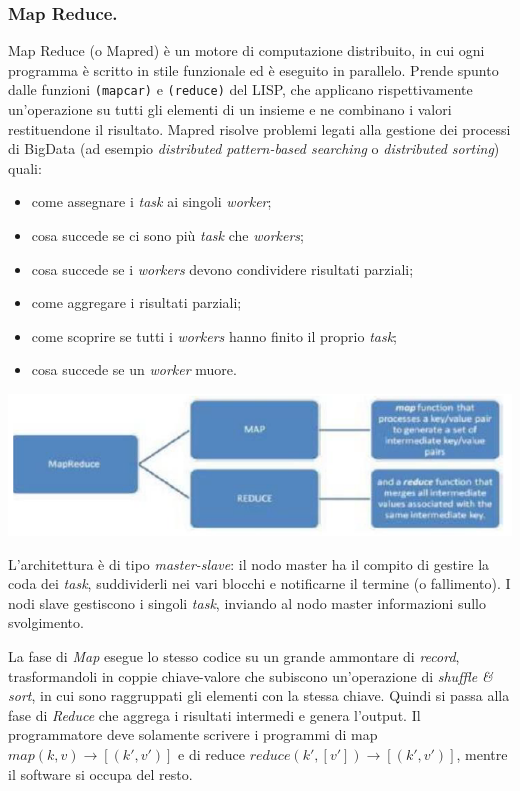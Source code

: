 \documentclass[a4page, 11pt]{article}
\begin{document}
\subsubsection{Map Reduce.}
Map Reduce (o Mapred) è un motore di computazione distribuito, in cui ogni programma è scritto in stile funzionale ed è eseguito in parallelo.
Prende spunto dalle funzioni \verb|(mapcar)| e \verb|(reduce)| del LISP, che applicano rispettivamente un'operazione su tutti gli elementi di un insieme e ne combinano i valori restituendone il risultato.
Mapred risolve problemi legati alla gestione dei processi di BigData (ad esempio \textit{distributed pattern-based searching} o \textit{distributed sorting}) quali:
\begin{itemize}
\item come assegnare i \textit{task} ai singoli \textit{worker};
\item cosa succede se ci sono più \textit{task} che \textit{workers};
\item cosa succede se i \textit{workers} devono condividere risultati parziali;
\item come aggregare i risultati parziali;
\item come scoprire se tutti i \textit{workers} hanno finito il proprio \textit{task};
\item cosa succede se un \textit{worker} muore.
\end{itemize}
\begin{center}
  \includegraphics[scale=1]{IMAGE8.png}
\end{center}

L'architettura è di tipo \textit{master-slave}: il nodo master ha il compito di gestire la coda dei \textit{task}, suddividerli nei vari blocchi e notificarne il termine (o fallimento).
I nodi slave gestiscono i singoli \textit{task}, inviando al nodo master informazioni sullo svolgimento.

La fase di \textit{Map} esegue lo stesso codice su un grande ammontare di \textit{record}, trasformandoli in coppie chiave-valore che subiscono un'operazione di \textit{shuffle \& sort}, in cui sono raggruppati gli elementi con la stessa chiave.
Quindi si passa alla fase di \textit{Reduce} che aggrega i risultati intermedi e genera l'output.
Il programmatore deve solamente scrivere i programmi di map $map (k, v) \rightarrow [(k', v')]$ e di reduce $reduce (k', [v']) \rightarrow [(k', v')]$, mentre il software si occupa del resto.
\end{document}
